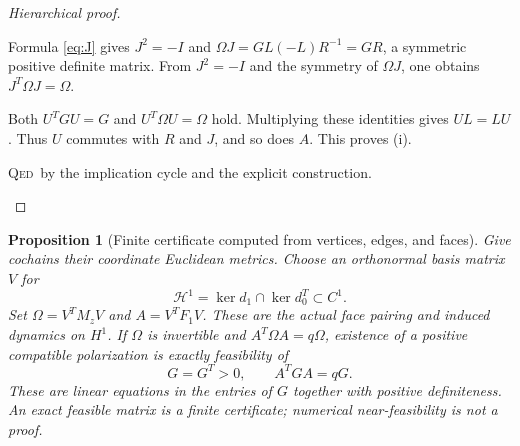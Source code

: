 \documentclass[11pt,a4paper]{article}
\newtheorem{proposition}[definition]{Proposition}
\theoremstyle{remark}\newtheorem{remark}[definition]{Remark}
\newcommand{\QED}{\textsc{Qed}}
\begin{document}
\begin{proof}[Hierarchical proof]
\begin{steps}
\begin{steps}
\item Formula \eqref{eq:J} gives $J^2=-I$ and $\Omega J=GL(-L)R^{-1}=GR$, a symmetric positive definite matrix. From $J^2=-I$ and the symmetry of $\Omega J$, one obtains $J^T\Omega J=\Omega$.
\item Both $U^TGU=G$ and $U^T\Omega U=\Omega$ hold. Multiplying these identities gives $UL=LU$. Thus $U$ commutes with $R$ and $J$, and so does $A$. This proves (i).
\end{steps}
\item \QED\ by the implication cycle and the explicit construction.
\end{steps}
\end{proof}

\begin{proposition}[Finite certificate computed from vertices, edges, and faces]\label{prop:certificate}
Give cochains their coordinate Euclidean metrics. Choose an orthonormal basis matrix $V$ for
\[
\mathcal H^1=\ker d_1\cap\ker d_0^T\subset C^1.
\]
Set $\Omega=V^TM_zV$ and $A=V^TF_1V$. These are the actual face pairing and induced dynamics on $H^1$. If $\Omega$ is invertible and $A^T\Omega A=q\Omega$, existence of a positive compatible polarization is exactly feasibility of
\[
G=G^T>0,\qquad A^TGA=qG.\tag{5.2}\label{eq:certificate}
\]
These are linear equations in the entries of $G$ together with positive definiteness. An exact feasible matrix is a finite certificate; numerical near-feasibility is not a proof.
\end{proposition}
\end{document}
